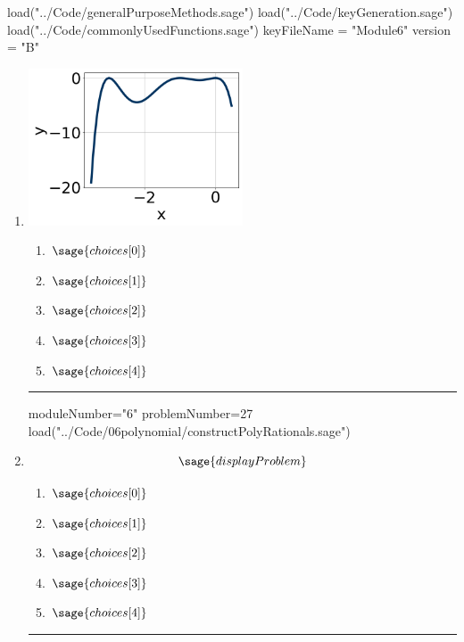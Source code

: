 \documentclass[14pt]{extbook}
\newcommand{\litem}[1]{\item#1\hspace*{-1cm}\rule{\textwidth}{0.4pt}}
\begin{document}
\pagestyle{fancy}

\begin{sagesilent}
load("../Code/generalPurposeMethods.sage")
load("../Code/keyGeneration.sage")
load("../Code/commonlyUsedFunctions.sage")
keyFileName = "Module6"
version = "B"
\end{sagesilent}

\begin{enumerate}


  \begin{sagesilent}
  moduleNumber="6"
  problemNumber=26
  load("../Code/06polynomial/polyGraphToFunction.sage")
  \end{sagesilent}

  \litem{ 

   \begin{center}
       \includegraphics[width=0.5\textwidth]{../Figures/polyGraphToFunctionB.png}
   \end{center}

  	\begin{enumerate}[label=\Alph*.]
    \item \( \sage{choices[0]} \)
    \item \( \sage{choices[1]} \)
    \item \( \sage{choices[2]} \)
    \item \( \sage{choices[3]} \)
    \item \( \sage{choices[4]} \)
  	\end{enumerate}
  }
\begin{sagesilent}
moduleNumber="6"
problemNumber=27
load("../Code/06polynomial/constructPolyRationals.sage")
\end{sagesilent}

\litem{ 

   \[ \sage{displayProblem} \]

  	\begin{enumerate}[label=\Alph*.]
    \item \( \sage{choices[0]} \)
    \item \( \sage{choices[1]} \)
    \item \( \sage{choices[2]} \)
    \item \( \sage{choices[3]} \)
    \item \( \sage{choices[4]} \)
  	\end{enumerate}
  }


\end{enumerate}
\end{document}

